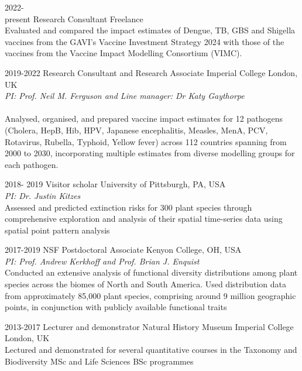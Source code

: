 \documentclass[icon]{twentysecondcv}
\begin{document}
\begin{twenty} %


 \twentyitem
    	{2022- \\ present}
    	{Research Consultant}
	{Freelance}
        	{\\ \small  Evaluated and compared the impact estimates of Dengue, TB, GBS and Shigella vaccines from the GAVI’s Vaccine Investment Strategy 2024 with those of the vaccines from the Vaccine Impact Modelling Consortium (VIMC).}
        	
	
 \twentyitem
       {2019-2022}
       {Research Consultant and Research Associate}
       {Imperial College London, UK}
       {\\ \textit{ PI: Prof. Neil M. Ferguson and Line manager: Dr Katy Gaythorpe} \\ 
       \\ \small Analysed, organised, and prepared vaccine impact estimates for 12 pathogens (Cholera, HepB, Hib, HPV, Japanese encephalitis, Measles, MenA, PCV, Rotavirus, Rubella, Typhoid, Yellow fever) across 112 countries spanning from 2000 to 2030, incorporating multiple estimates from diverse modelling groups for each pathogen.}
      
\twentyitem
    	{2018- 2019}
	{Visitor scholar}
        	{University of Pittsburgh, PA, USA}
        	{\\ \textit{PI: Dr. Justin Kitzes} \\ \small Assessed and predicted extinction risks for 300 plant species through comprehensive exploration and analysis of their spatial time-series data using spatial point pattern analysis}

	\twentyitem
    	{2017-2019}
	{NSF Postdoctoral Associate}
        {Kenyon College, OH, USA}
        {\\ \textit{PI: Prof. Andrew Kerkhoff and Prof. Brian J. Enquist} \\  \small Conducted an extensive analysis of functional diversity distributions among plant species across the biomes of North and South America. Used distribution data from approximately 85,000 plant species, comprising around 9 million geographic points, in conjunction with publicly available functional traits}
      
    
    \twentyitem
	{2013-2017}
	{Lecturer and demonstrator}
	{Natural History Museum  Imperial College London, UK}
	{\\ \small Lectured and demonstrated for several quantitative courses in the Taxonomy and Biodiversity MSc and Life Sciences BSc programmes}
\end{twenty}
\end{document}
